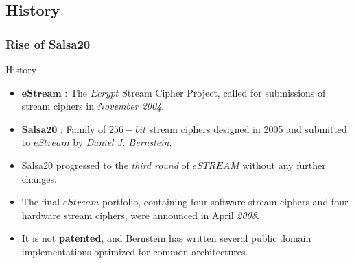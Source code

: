 \subsection{History}

\begin{frame}
\frametitle{Rise of Salsa20}

\begin{block}{History}
\begin{itemize}
    \item $\mathbf{eStream}$ : The $Ecrypt$ Stream Cipher Project, called for submissions of stream ciphers in \textit{November 2004}. 
    \item $\mathbf{Salsa20}$ : Family of $256-bit$ stream ciphers designed in 2005 and submitted to $eStream$ by \textit{Daniel J. Bernstein}.
    \item Salsa20 progressed to the \textit{third round} of $eSTREAM$ without any further changes.
    \item The final $eStream$ portfolio, containing four software stream ciphers and four hardware stream ciphers, were announced in April  \textit{2008}.
    \item It is not \textbf{patented}, and Bernstein has written several public domain implementations optimized for common architectures.
\end{itemize}

\end{block}
\end{frame}

